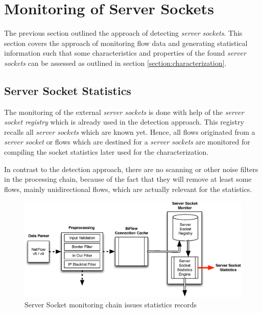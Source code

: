\section{Monitoring of Server Sockets 
\label{section:socket_tracking}}

The previous section outlined the approach of detecting \emph{server sockets}. This section covers the approach of monitoring flow data and generating statistical information such that some characteristics and properties of the found \emph{server sockets} can be assessed as outlined in section \ref{section:characterization}.

\subsection{Server Socket Statistics} The monitoring of the external \emph{server sockets} is done with help of the \emph{server socket registry} which is already used in the detection approach. This registry recalls all \emph{server sockets} which are known yet. Hence, all flows originated from a \emph{server socket} or flows which are destined for a \emph{server sockets} are monitored for compiling the socket statistics later used for the characterization.

In contrast to the detection approach, there are no scanning or other noise filters in the processing chain, because of the fact that they will remove at least some flows, mainly unidirectional flows, which are actually relevant for the statistics. 
\begin{figure}
	[ht] \centering
	
	\includegraphics[width=\linewidth]{images/TrackingChain.eps}
	\caption{Server Socket monitoring chain issues statistics records} 
	\label{fig:monitoring_chain} 
\end{figure}

